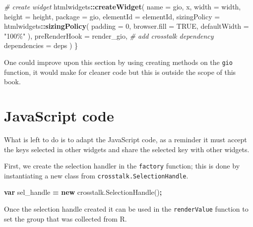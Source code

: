 \documentclass[
  10pt,
]{krantz}
\makeatletter
\newenvironment{Shaded}{\begin{snugshade}}{\end{snugshade}}
\newcommand{\AttributeTok}[1]{\textcolor[rgb]{0.61,0.61,0.61}{#1}}
\newcommand{\CommentTok}[1]{\textcolor[rgb]{0.37,0.37,0.37}{\textit{#1}}}
\newcommand{\DataTypeTok}[1]{\textcolor[rgb]{0.27,0.27,0.27}{#1}}
\newcommand{\DecValTok}[1]{\textcolor[rgb]{0.06,0.06,0.06}{#1}}
\newcommand{\KeywordTok}[1]{\textcolor[rgb]{0.27,0.27,0.27}{\textbf{#1}}}
\newcommand{\NormalTok}[1]{#1}
\newcommand{\OperatorTok}[1]{\textcolor[rgb]{0.43,0.43,0.43}{\textbf{#1}}}
\newcommand{\OtherTok}[1]{\textcolor[rgb]{0.37,0.37,0.37}{#1}}
\newcommand{\StringTok}[1]{\textcolor[rgb]{0.5,0.5,0.5}{#1}}
\newcommand{\VariableTok}[1]{\textcolor[rgb]{0,0,0}{#1}}
\newenvironment{kframe}{%
\medskip{}
\setlength{\fboxsep}{.8em}
 \def\at@end@of@kframe{}%
 \ifinner\ifhmode%
  \def\at@end@of@kframe{\end{minipage}}%
  \begin{minipage}{\columnwidth}%
 \fi\fi%
 \def\FrameCommand##1{\hskip\@totalleftmargin \hskip-\fboxsep
 \colorbox{shadecolor}{##1}\hskip-\fboxsep
     \hskip-\linewidth \hskip-\@totalleftmargin \hskip\columnwidth}%
 \MakeFramed {\advance\hsize-\width
   \@totalleftmargin\z@ \linewidth\hsize
   \@setminipage}}%
 {\par\unskip\endMakeFramed%
 \at@end@of@kframe}
\renewenvironment{Shaded}{\begin{kframe}}{\end{kframe}}
\newenvironment{rmdblock}[1]
  {
  \begin{itemize}
  \renewcommand{\labelitemi}{
    \raisebox{-.7\height}[0pt][0pt]{
      {\setkeys{Gin}{width=3em,keepaspectratio}\texttt{[image: images/\#1]}}
    }
  }
  \setlength{\fboxsep}{1em}
  \begin{kframe}
  \item
  }
  {
  \end{kframe}
  \end{itemize}
  }
\newenvironment{rmdnote}
  {\begin{rmdblock}{note}}
  {\end{rmdblock}}
\makeatother
\begin{document}
\begin{Shaded}
\begin{Highlighting}[]
  \CommentTok{\# create widget}
\NormalTok{  htmlwidgets}\OperatorTok{::}\KeywordTok{createWidget}\NormalTok{(}
    \DataTypeTok{name =} \StringTok{\textquotesingle{}gio\textquotesingle{}}\NormalTok{,}
\NormalTok{    x,}
    \DataTypeTok{width =}\NormalTok{ width,}
    \DataTypeTok{height =}\NormalTok{ height,}
    \DataTypeTok{package =} \StringTok{\textquotesingle{}gio\textquotesingle{}}\NormalTok{,}
    \DataTypeTok{elementId =}\NormalTok{ elementId,}
    \DataTypeTok{sizingPolicy =}\NormalTok{ htmlwidgets}\OperatorTok{::}\KeywordTok{sizingPolicy}\NormalTok{(}
      \DataTypeTok{padding =} \DecValTok{0}\NormalTok{,}
      \DataTypeTok{browser.fill =} \OtherTok{TRUE}\NormalTok{,}
      \DataTypeTok{defaultWidth =} \StringTok{"100\%"}
\NormalTok{    ),}
    \DataTypeTok{preRenderHook =}\NormalTok{ render\_gio,}
    \CommentTok{\# add crosstalk dependency}
    \DataTypeTok{dependencies =}\NormalTok{ deps}
\NormalTok{  )}
\NormalTok{\}}
\end{Highlighting}
\end{Shaded}

\begin{rmdnote}
One could improve upon this section by using creating methods on the
\texttt{gio} function, it would make for cleaner code but this is
outside the scope of this book.
\end{rmdnote}

\hypertarget{linking-widgets-js}{%
\section{JavaScript code}\label{linking-widgets-js}}

What is left to do is to adapt the JavaScript code, as a reminder it must accept the keys selected in other widgets and share the selected key with other widgets.

First, we create the selection handler in the \texttt{factory} function; this is done by instantiating a new class from \texttt{crosstalk.SelectionHandle}.

\begin{Shaded}
\begin{Highlighting}[]
\KeywordTok{var}\NormalTok{ sel\_handle }\OperatorTok{=} \KeywordTok{new} \VariableTok{crosstalk}\NormalTok{.}\AttributeTok{SelectionHandle}\NormalTok{()}\OperatorTok{;}
\end{Highlighting}
\end{Shaded}

Once the selection handle created it can be used in the \texttt{renderValue} function to set the group that was collected from R.
\end{document}
